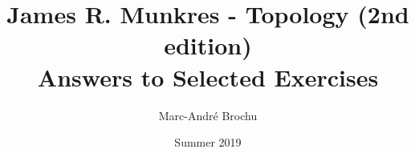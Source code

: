 \documentclass{book}
\begin{document}
\title{James R. Munkres - Topology (2nd edition)\\Answers to Selected Exercises}
\author{Marc-André Brochu}
\date{Summer 2019}
\maketitle

\setcounter{chapter}{2}


\end{document}
